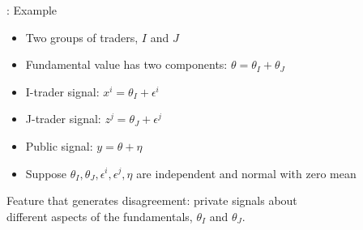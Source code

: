 \documentclass[english,10pt
,aspectratio=169
]{beamer}
\begin{document}
%
%


\begin{frame}{\cite{kondor_more_2012}: Example}
	\begin{itemize}
		\item Two groups of traders, $I$ and $J$
		\item Fundamental value has two components: $\theta=\theta_{I}+\theta_{J}$
		\item I-trader signal: $x^{i} = \theta_{I}+\epsilon^{i}$
		\item J-trader signal: $z^{j} = \theta_{J}+\epsilon^{j}$
		\item Public signal: $y = \theta + \eta$
		\item Suppose $\theta_{I},\theta_{J}, \epsilon^{i}, \epsilon^{j}, \eta$ are independent and normal with zero mean
	\end{itemize}
	Feature that generates disagreement: private signals about \\different aspects of the fundamentals, $\theta_I$ and $\theta_J$.
\end{frame}
\end{document}
